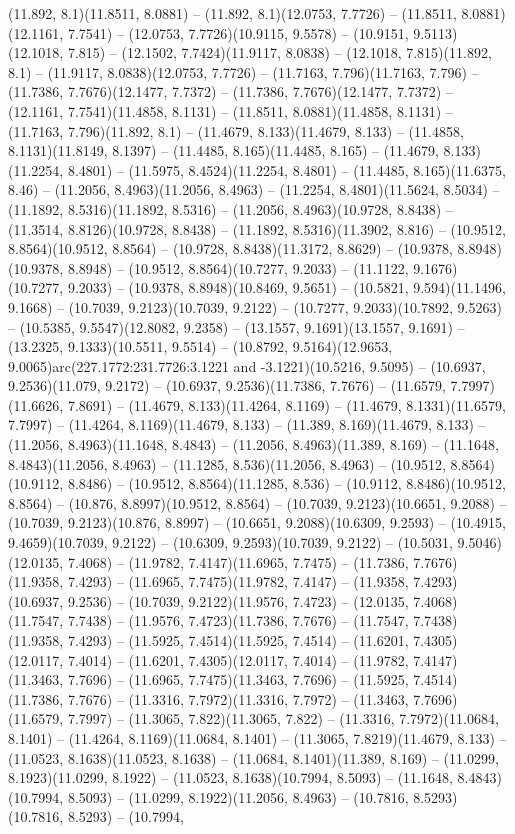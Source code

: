 (11.892, 8.1)(11.8511, 8.0881) -- (11.892, 8.1)(12.0753, 7.7726) -- (11.8511, 8.0881)(12.1161, 7.7541) -- (12.0753, 7.7726)(10.9115, 9.5578) -- (10.9151, 9.5113)(12.1018, 7.815) -- (12.1502, 7.7424)(11.9117, 8.0838) -- (12.1018, 7.815)(11.892, 8.1) -- (11.9117, 8.0838)(12.0753, 7.7726) -- (11.7163, 7.796)(11.7163, 7.796) -- (11.7386, 7.7676)(12.1477, 7.7372) -- (11.7386, 7.7676)(12.1477, 7.7372) -- (12.1161, 7.7541)(11.4858, 8.1131) -- (11.8511, 8.0881)(11.4858, 8.1131) -- (11.7163, 7.796)(11.892, 8.1) -- (11.4679, 8.133)(11.4679, 8.133) -- (11.4858, 8.1131)(11.8149, 8.1397) -- (11.4485, 8.165)(11.4485, 8.165) -- (11.4679, 8.133)(11.2254, 8.4801) -- (11.5975, 8.4524)(11.2254, 8.4801) -- (11.4485, 8.165)(11.6375, 8.46) -- (11.2056, 8.4963)(11.2056, 8.4963) -- (11.2254, 8.4801)(11.5624, 8.5034) -- (11.1892, 8.5316)(11.1892, 8.5316) -- (11.2056, 8.4963)(10.9728, 8.8438) -- (11.3514, 8.8126)(10.9728, 8.8438) -- (11.1892, 8.5316)(11.3902, 8.816) -- (10.9512, 8.8564)(10.9512, 8.8564) -- (10.9728, 8.8438)(11.3172, 8.8629) -- (10.9378, 8.8948)(10.9378, 8.8948) -- (10.9512, 8.8564)(10.7277, 9.2033) -- (11.1122, 9.1676)(10.7277, 9.2033) -- (10.9378, 8.8948)(10.8469, 9.5651) -- (10.5821, 9.594)(11.1496, 9.1668) -- (10.7039, 9.2123)(10.7039, 9.2122) -- (10.7277, 9.2033)(10.7892, 9.5263) -- (10.5385, 9.5547)(12.8082, 9.2358) -- (13.1557, 9.1691)(13.1557, 9.1691) -- (13.2325, 9.1333)(10.5511, 9.5514) -- (10.8792, 9.5164)(12.9653, 9.0065)arc(227.1772:231.7726:3.1221 and -3.1221)(10.5216, 9.5095) -- (10.6937, 9.2536)(11.079, 9.2172) -- (10.6937, 9.2536)(11.7386, 7.7676) -- (11.6579, 7.7997)(11.6626, 7.8691) -- (11.4679, 8.133)(11.4264, 8.1169) -- (11.4679, 8.1331)(11.6579, 7.7997) -- (11.4264, 8.1169)(11.4679, 8.133) -- (11.389, 8.169)(11.4679, 8.133) -- (11.2056, 8.4963)(11.1648, 8.4843) -- (11.2056, 8.4963)(11.389, 8.169) -- (11.1648, 8.4843)(11.2056, 8.4963) -- (11.1285, 8.536)(11.2056, 8.4963) -- (10.9512, 8.8564)(10.9112, 8.8486) -- (10.9512, 8.8564)(11.1285, 8.536) -- (10.9112, 8.8486)(10.9512, 8.8564) -- (10.876, 8.8997)(10.9512, 8.8564) -- (10.7039, 9.2123)(10.6651, 9.2088) -- (10.7039, 9.2123)(10.876, 8.8997) -- (10.6651, 9.2088)(10.6309, 9.2593) -- (10.4915, 9.4659)(10.7039, 9.2122) -- (10.6309, 9.2593)(10.7039, 9.2122) -- (10.5031, 9.5046)(12.0135, 7.4068) -- (11.9782, 7.4147)(11.6965, 7.7475) -- (11.7386, 7.7676)(11.9358, 7.4293) -- (11.6965, 7.7475)(11.9782, 7.4147) -- (11.9358, 7.4293)(10.6937, 9.2536) -- (10.7039, 9.2122)(11.9576, 7.4723) -- (12.0135, 7.4068)(11.7547, 7.7438) -- (11.9576, 7.4723)(11.7386, 7.7676) -- (11.7547, 7.7438)(11.9358, 7.4293) -- (11.5925, 7.4514)(11.5925, 7.4514) -- (11.6201, 7.4305)(12.0117, 7.4014) -- (11.6201, 7.4305)(12.0117, 7.4014) -- (11.9782, 7.4147)(11.3463, 7.7696) -- (11.6965, 7.7475)(11.3463, 7.7696) -- (11.5925, 7.4514)(11.7386, 7.7676) -- (11.3316, 7.7972)(11.3316, 7.7972) -- (11.3463, 7.7696)(11.6579, 7.7997) -- (11.3065, 7.822)(11.3065, 7.822) -- (11.3316, 7.7972)(11.0684, 8.1401) -- (11.4264, 8.1169)(11.0684, 8.1401) -- (11.3065, 7.8219)(11.4679, 8.133) -- (11.0523, 8.1638)(11.0523, 8.1638) -- (11.0684, 8.1401)(11.389, 8.169) -- (11.0299, 8.1923)(11.0299, 8.1922) -- (11.0523, 8.1638)(10.7994, 8.5093) -- (11.1648, 8.4843)(10.7994, 8.5093) -- (11.0299, 8.1922)(11.2056, 8.4963) -- (10.7816, 8.5293)(10.7816, 8.5293) -- (10.7994, 